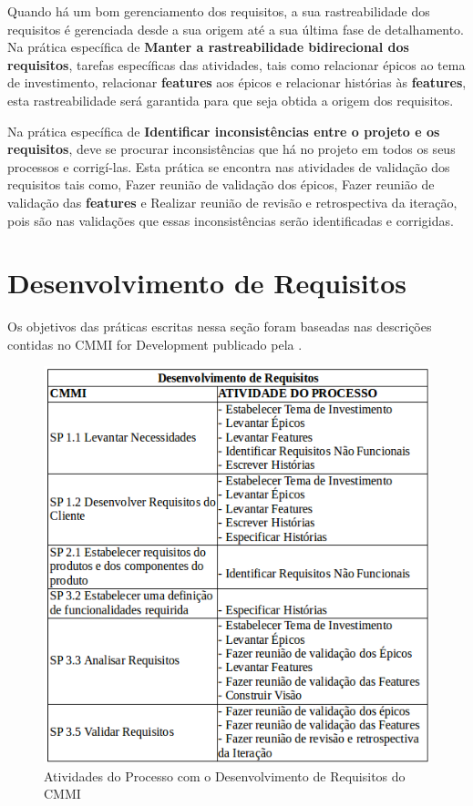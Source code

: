 Quando há um bom gerenciamento dos requisitos, a sua rastreabilidade dos requisitos é gerenciada desde a sua origem até a sua última fase de detalhamento. Na prática específica de \textbf{Manter a rastreabilidade bidirecional dos requisitos}, tarefas específicas das atividades, tais como relacionar épicos ao tema de investimento, relacionar \textbf{features} aos épicos e relacionar histórias às \textbf{features}, esta rastreabilidade será garantida para que seja obtida a origem dos requisitos.

Na prática específica de \textbf{Identificar inconsistências entre o projeto e os requisitos}, deve se procurar inconsistências que há no projeto em todos os seus processos e corrigí-las. Esta prática se encontra nas atividades de validação dos requisitos tais como, Fazer reunião de validação dos épicos, Fazer reunião de validação das \textbf{features} e Realizar reunião de revisão e retrospectiva da iteração, pois são nas validações que essas inconsistências serão identificadas e corrigidas.

\section{Desenvolvimento de Requisitos}

Os objetivos das práticas escritas nessa seção foram baseadas nas descrições contidas no CMMI for Development publicado pela .

\begin{figure}[!htb]
\centering
\includegraphics[scale=0.6]{figuras/desenvolvimento.png}
\caption{Atividades do Processo com o Desenvolvimento de Requisitos do CMMI}
\label{fig:desenvolvimento}
\end{figure}

